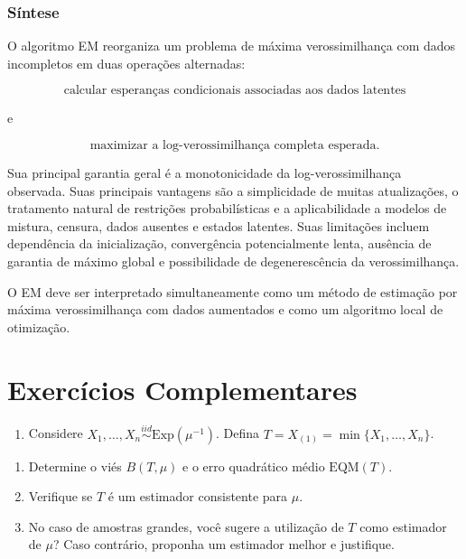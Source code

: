 \documentclass[
  letterpaper,
  DIV=11,
  numbers=noendperiod]{scrreprt}
\providecommand{\tightlist}{%
  \setlength{\itemsep}{0pt}\setlength{\parskip}{0pt}}\usepackage{longtable,booktabs,array}
\begin{document}
\subsection{Síntese}\label{suxedntese-2}

O algoritmo EM reorganiza um problema de máxima verossimilhança com
dados incompletos em duas operações alternadas:

\[\text{calcular esperanças condicionais associadas aos dados latentes}\]

e

\[\text{maximizar a log-verossimilhança completa esperada}.\]

Sua principal garantia geral é a monotonicidade da log-verossimilhança
observada. Suas principais vantagens são a simplicidade de muitas
atualizações, o tratamento natural de restrições probabilísticas e a
aplicabilidade a modelos de mistura, censura, dados ausentes e estados
latentes. Suas limitações incluem dependência da inicialização,
convergência potencialmente lenta, ausência de garantia de máximo global
e possibilidade de degenerescência da verossimilhança.

O EM deve ser interpretado simultaneamente como um método de estimação
por máxima verossimilhança com dados aumentados e como um algoritmo
local de otimização.


\chapter*{Exercícios Complementares}\label{exercuxedcios-complementares}


\begin{enumerate}
\def\labelenumi{\arabic{enumi}.}
\tightlist
\item
  Considere
  \(X_1, \ldots, X_n \overset{iid}{\sim} \text{Exp}(\mu^{-1})\). Defina
  \(T = X_{(1)} = \min\{X_1, \ldots, X_n\}\).
\end{enumerate}

\begin{enumerate}
\def\labelenumi{\alph{enumi}.}
\item
  Determine o viés \(B(T,\mu)\) e o erro quadrático médio
  \(\text{EQM}(T)\).
\item
  Verifique se \(T\) é um estimador consistente para \(\mu\).
\item
  No caso de amostras grandes, você sugere a utilização de \(T\) como
  estimador de \(\mu\)? Caso contrário, proponha um estimador melhor e
  justifique.
\end{enumerate}
\end{document}
